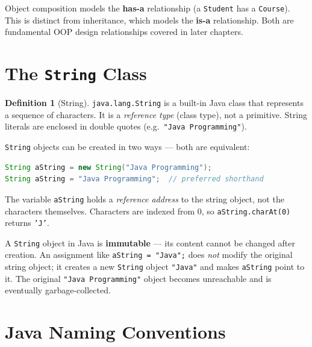 \documentclass[11pt, a4paper, notitlepage]{report}
\theoremstyle{definition}
\newtheorem{definition}[theorem]{Definition}
\theoremstyle{remark}
\theoremstyle{definition}
\begin{document}
\begin{examtip}[title={Exam Tip: Has-a vs.\ Is-a}]
Object composition models the \textbf{has-a} relationship (a \texttt{Student} has a \texttt{Course}). This is distinct from inheritance, which models the \textbf{is-a} relationship. Both are fundamental OOP design relationships covered in later chapters.
\end{examtip}

\section{The \texttt{String} Class}
\label{sec:ch2-string}

\begin{definition}[String]
\label{def:ch2-string}
\texttt{java.lang.String} is a built-in Java class that represents a sequence of characters. It is a \emph{reference type} (class type), not a primitive. String literals are enclosed in double quotes (e.g.\ \texttt{"Java Programming"}).
\end{definition}

\texttt{String} objects can be created in two ways --- both are equivalent:

\begin{lstlisting}[language=Java]
String aString = new String("Java Programming");
String aString = "Java Programming";  // preferred shorthand
\end{lstlisting}

The variable \texttt{aString} holds a \emph{reference address} to the string object, not the characters themselves. Characters are indexed from 0, so \texttt{aString.charAt(0)} returns \texttt{'J'}.

\begin{keyresult}[title={Key Result: Strings are Immutable}]
A \texttt{String} object in Java is \textbf{immutable} --- its content cannot be changed after creation. An assignment like \texttt{aString = "Java";} does \emph{not} modify the original string object; it creates a new \texttt{String} object \texttt{"Java"} and makes \texttt{aString} point to it. The original \texttt{"Java Programming"} object becomes unreachable and is eventually garbage-collected.
\end{keyresult}

\section{Java Naming Conventions}
\label{sec:ch2-naming}
\end{document}
